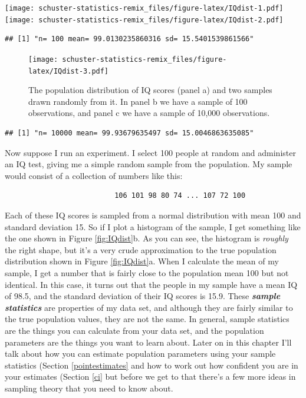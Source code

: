 \documentclass[
]{book}
\begin{document}
\texttt{[image: schuster-statistics-remix\_files/figure-latex/IQdist-1.pdf]} \texttt{[image: schuster-statistics-remix\_files/figure-latex/IQdist-2.pdf]}

\begin{verbatim}
## [1] "n= 100 mean= 99.0130235860316 sd= 15.5401539861566"
\end{verbatim}

\begin{figure}
\centering
\texttt{[image: schuster-statistics-remix\_files/figure-latex/IQdist-3.pdf]}
\caption{\label{fig:IQdist-3}The population distribution of IQ scores (panel a) and two samples drawn randomly from it. In panel b we have a sample of 100 observations, and panel c we have a sample of 10,000 observations.}
\end{figure}

\begin{verbatim}
## [1] "n= 10000 mean= 99.93679635497 sd= 15.0046863635085"
\end{verbatim}

Now suppose I run an experiment. I select 100 people at random and administer an IQ test, giving me a simple random sample from the population. My sample would consist of a collection of numbers like this:

\begin{verbatim}
                          106 101 98 80 74 ... 107 72 100
\end{verbatim}

Each of these IQ scores is sampled from a normal distribution with mean 100 and standard deviation 15. So if I plot a histogram of the sample, I get something like the one shown in Figure \ref{fig:IQdist}b. As you can see, the histogram is \emph{roughly} the right shape, but it's a very crude approximation to the true population distribution shown in Figure \ref{fig:IQdist}a. When I calculate the mean of my sample, I get a number that is fairly close to the population mean 100 but not identical. In this case, it turns out that the people in my sample have a mean IQ of 98.5, and the standard deviation of their IQ scores is 15.9. These \textbf{\emph{sample statistics}} are properties of my data set, and although they are fairly similar to the true population values, they are not the same. In general, sample statistics are the things you can calculate from your data set, and the population parameters are the things you want to learn about. Later on in this chapter I'll talk about how you can estimate population parameters using your sample statistics (Section \ref{pointestimates} and how to work out how confident you are in your estimates (Section \ref{ci} but before we get to that there's a few more ideas in sampling theory that you need to know about.
\end{document}
